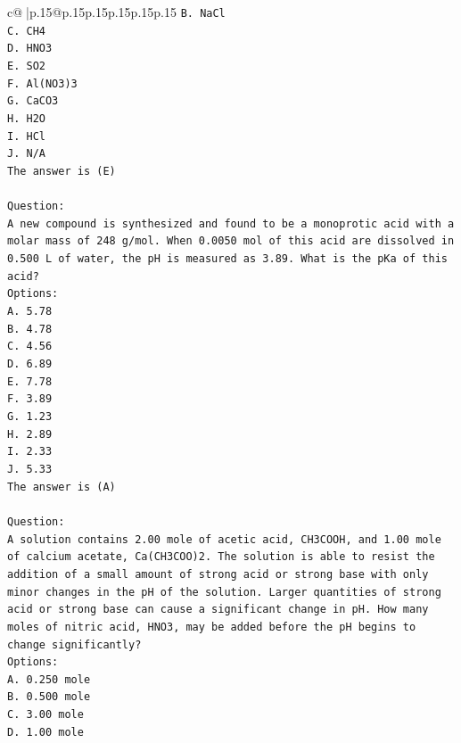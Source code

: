 \documentclass{article}
\begin{document}
{\begin{supertabular}{c@{$\;$}|p{.15\linewidth}@{}p{.15\linewidth}p{.15\linewidth}p{.15\linewidth}p{.15\linewidth}p{.15\linewidth}}
{{{\texttt{B. NaCl} \\
\texttt{C. CH4} \\
\texttt{D. HNO3} \\
\texttt{E. SO2} \\
\texttt{F. Al(NO3)3} \\
\texttt{G. CaCO3} \\
\texttt{H. H2O} \\
\texttt{I. HCl} \\
\texttt{J. N/A} \\
\texttt{The answer is (E)} \\
\\ 
\texttt{Question:} \\
\texttt{A new compound is synthesized and found to be a monoprotic acid with a molar mass of 248 g/mol. When 0.0050 mol of this acid are dissolved in 0.500 L of water, the pH is measured as 3.89. What is the pKa of this acid?} \\
\texttt{Options:} \\
\texttt{A. 5.78} \\
\texttt{B. 4.78} \\
\texttt{C. 4.56} \\
\texttt{D. 6.89} \\
\texttt{E. 7.78} \\
\texttt{F. 3.89} \\
\texttt{G. 1.23} \\
\texttt{H. 2.89} \\
\texttt{I. 2.33} \\
\texttt{J. 5.33} \\
\texttt{The answer is (A)} \\
\\ 
\texttt{Question:} \\
\texttt{A solution contains 2.00 mole of acetic acid, CH3COOH, and 1.00 mole of calcium acetate, Ca(CH3COO)2. The solution is able to resist the addition of a small amount of strong acid or strong base with only minor changes in the pH of the solution. Larger quantities of strong acid or strong base can cause a significant change in pH. How many moles of nitric acid, HNO3, may be added before the pH begins to change significantly?} \\
\texttt{Options:} \\
\texttt{A. 0.250 mole} \\
\texttt{B. 0.500 mole} \\
\texttt{C. 3.00 mole} \\
\texttt{D. 1.00 mole} \\
}}}
\end{supertabular}}
\end{document}
